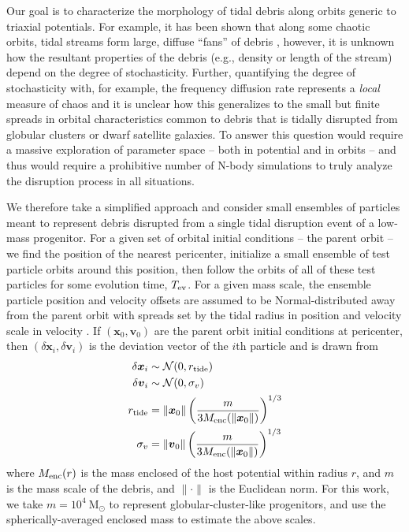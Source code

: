 \documentclass[letterpaper,12pt,preprint]{aastex}
\newcommand{\msun}{\mathrm{M}_\odot}
\newcommand{\bs}[1]{\boldsymbol{#1}}
\begin{document}
Our goal is to characterize the morphology of tidal debris along orbits generic to triaxial potentials. For example, it has been shown that along some chaotic orbits, tidal streams form large, diffuse ``fans'' of debris \citep[e.g.][]{fardal14, pearson15}, however, it is unknown how the resultant properties of the debris (e.g., density or length of the stream) depend on the degree of stochasticity. Further, quantifying the degree of stochasticity with, for example, the frequency diffusion rate represents a \emph{local} measure of chaos and it is unclear how this generalizes to the small but finite spreads in orbital characteristics common to debris that is tidally disrupted from globular clusters or dwarf satellite galaxies. To answer this question would require a massive exploration of parameter space -- both in potential and in orbits -- and thus would require a prohibitive number of N-body simulations to truly analyze the disruption process in all situations.

We therefore take a simplified approach and consider small ensembles of particles meant to represent debris disrupted from a single tidal disruption event of a low-mass progenitor. For a given set of orbital initial conditions -- the parent orbit -- we find the position of the nearest pericenter, initialize a small ensemble of test particle orbits around this position, then follow the orbits of all of these test particles for some evolution time, $T_{\rm ev}$. For a given mass scale, the ensemble particle position and velocity offsets are assumed to be Normal-distributed away from the parent orbit with spreads set by the tidal radius in position and velocity scale in velocity \citep[e.g.,][]{johnston98, apw14}. If $(\bs{x}_0,\bs{v}_0)$ are the parent orbit initial conditions at pericenter, then $(\delta\bs{x}_i,\delta\bs{v}_i)$ is the deviation vector of the $i$th particle and is drawn from
\begin{align}
	\delta\bs{x}_i &\sim \mathcal{N}(0, r_{\rm tide})\\
	\delta\bs{v}_i &\sim \mathcal{N}(0, \sigma_v)\\
	r_{\rm tide} &= \|\bs{x}_0\| \left(\frac{m}{3M_{\rm enc}(\|\bs{x}_0\|)}\right)^{1/3} \\
	\sigma_v &= \|\bs{v}_0\|\left(\frac{m}{3M_{\rm enc}(\|\bs{x}_0\|)}\right)^{1/3} 
\end{align}
where $M_{\rm enc}(r)$ is the mass enclosed of the host potential within radius $r$, and $m$ is the mass scale of the debris, and $\|\cdot \|$ is the Euclidean norm. For this work, we take $m=10^4~\msun$ to represent globular-cluster-like progenitors, and use the spherically-averaged enclosed mass to estimate the above scales.
\end{document}
